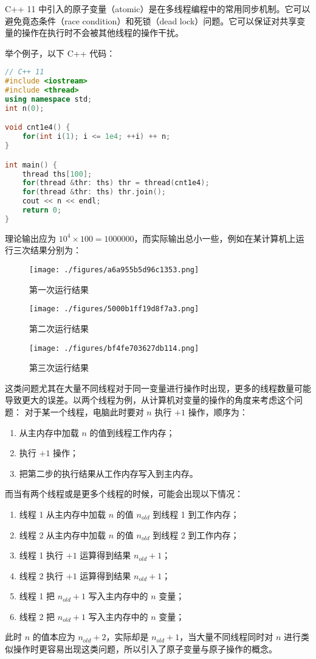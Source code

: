 
\begin{issues}
\issueDraft
\issueTODO
\end{issues}


C++ 11 中引入的原子变量（atomic）是在多线程编程中的常用同步机制。它可以避免竟态条件（race condition）和死锁（dead lock）问题。它可以保证对共享变量的操作在执行时不会被其他线程的操作干扰。

举个例子，以下 C++ 代码：
\begin{lstlisting}[language=cpp]
// C++ 11
#include <iostream>
#include <thread>
using namespace std;
int n(0);

void cnt1e4() {
	for(int i(1); i <= 1e4; ++i) ++ n;
}

int main() {
	thread ths[100];
	for(thread &thr: ths) thr = thread(cnt1e4);
	for(thread &thr: ths) thr.join();
	cout << n << endl;
	return 0;
}
\end{lstlisting}
理论输出应为 $10^4 \times 100 = 1000000$，而实际输出总小一些，例如在某计算机上运行三次结果分别为：
\begin{figure}[ht]
\centering
\texttt{[image: ./figures/a6a955b5d96c1353.png]}
\caption{第一次运行结果} \label{fig_atomVO_1}
\end{figure}
\begin{figure}[ht]
\centering
\texttt{[image: ./figures/5000b1ff19d8f7a3.png]}
\caption{第二次运行结果} \label{fig_atomVO_2}
\end{figure}
\begin{figure}[ht]
\centering
\texttt{[image: ./figures/bf4fe703627db114.png]}
\caption{第三次运行结果} \label{fig_atomVO_3}
\end{figure}
这类问题尤其在大量不同线程对于同一变量进行操作时出现，更多的线程数量可能导致更大的误差。以两个线程为例，从计算机对变量的操作的角度来考虑这个问题：
对于某一个线程，电脑此时要对 $n$ 执行 $+1$ 操作，顺序为：
\begin{enumerate}
\item 从主内存中加载 $n$ 的值到线程工作内存；
\item 执行 $+1$ 操作；
\item 把第二步的执行结果从工作内存写入到主内存。
\end{enumerate}
而当有两个线程或是更多个线程的时候，可能会出现以下情况：
\begin{enumerate}
\item 线程 1 从主内存中加载 $n$ 的值 $n_{old}$ 到线程 1 到工作内存；
\item 线程 2 从主内存中加载 $n$ 的值 $n_{old}$ 到线程 2 到工作内存；
\item 线程 1 执行 $+1$ 运算得到结果 $n_{old}+1$；
\item 线程 2 执行 $+1$ 运算得到结果 $n_{old}+1$；
\item 线程 1 把 $n_{old}+1$ 写入主内存中的 $n$ 变量；
\item 线程 2 把 $n_{old}+1$ 写入主内存中的 $n$ 变量；
\end{enumerate}
此时 $n$ 的值本应为 $n_{old} + 2$，实际却是 $n_{old}+1$，当大量不同线程同时对 $n$ 进行类似操作时更容易出现这类问题，所以引入了原子变量与原子操作的概念。


